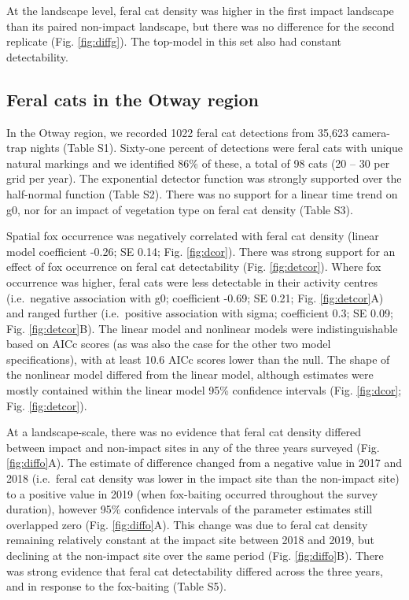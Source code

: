 \documentclass[]{elsarticle} %
\begin{document}
At the landscape level, feral cat density was higher in the first impact landscape than its paired non-impact landscape, but there was no difference for the second replicate (Fig. \ref{fig:diffg}). The top-model in this set also had constant detectability.

\hypertarget{feral-cats-in-the-otway-region}{%
\subsection{Feral cats in the Otway region}\label{feral-cats-in-the-otway-region}}

In the Otway region, we recorded 1022 feral cat detections from 35,623 camera-trap nights (Table S1). Sixty-one percent of detections were feral cats with unique natural markings and we identified 86\% of these, a total of 98 cats (20 -- 30 per grid per year). The exponential detector function was strongly supported over the half-normal function (Table S2). There was no support for a linear time trend on g0, nor for an impact of vegetation type on feral cat density (Table S3).

Spatial fox occurrence was negatively correlated with feral cat density (linear model coefficient -0.26; SE 0.14; Fig. \ref{fig:dcor}). There was strong support for an effect of fox occurrence on feral cat detectability (Fig. \ref{fig:detcor}). Where fox occurrence was higher, feral cats were less detectable in their activity centres (i.e.~negative association with g0; coefficient -0.69; SE 0.21; Fig. \ref{fig:detcor}A) and ranged further (i.e.~positive association with sigma; coefficient 0.3; SE 0.09; Fig. \ref{fig:detcor}B). The linear model and nonlinear models were indistinguishable based on AICc scores (as was also the case for the other two model specifications), with at least 10.6 AICc scores lower than the null. The shape of the nonlinear model differed from the linear model, although estimates were mostly contained within the linear model 95\% confidence intervals (Fig. \ref{fig:dcor}; Fig. \ref{fig:detcor}).

At a landscape-scale, there was no evidence that feral cat density differed between impact and non-impact sites in any of the three years surveyed (Fig. \ref{fig:diffo}A). The estimate of difference changed from a negative value in 2017 and 2018 (i.e.~feral cat density was lower in the impact site than the non-impact site) to a positive value in 2019 (when fox-baiting occurred throughout the survey duration), however 95\% confidence intervals of the parameter estimates still overlapped zero (Fig. \ref{fig:diffo}A). This change was due to feral cat density remaining relatively constant at the impact site between 2018 and 2019, but declining at the non-impact site over the same period (Fig. \ref{fig:diffo}B). There was strong evidence that feral cat detectability differed across the three years, and in response to the fox-baiting (Table S5).
\end{document}
